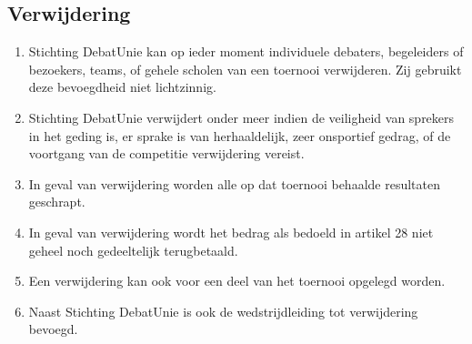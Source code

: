 \subsection{Verwijdering}

\begin{enumerate}
\item Stichting DebatUnie kan op ieder moment individuele debaters, begeleiders of bezoekers, teams, of gehele scholen van een toernooi verwijderen. Zij gebruikt deze bevoegdheid niet lichtzinnig.
\item Stichting DebatUnie verwijdert onder meer indien de veiligheid van sprekers in het geding is, er sprake is van herhaaldelijk, zeer onsportief gedrag, of de voortgang van de competitie verwijdering vereist.
\item In geval van verwijdering worden alle op dat toernooi behaalde resultaten geschrapt.
\item In geval van verwijdering wordt het bedrag als bedoeld in artikel 28 niet geheel noch gedeeltelijk terugbetaald.
\item Een verwijdering kan ook voor een deel van het toernooi opgelegd worden.
\item Naast Stichting DebatUnie is ook de wedstrijdleiding tot verwijdering bevoegd.
\end{enumerate}
